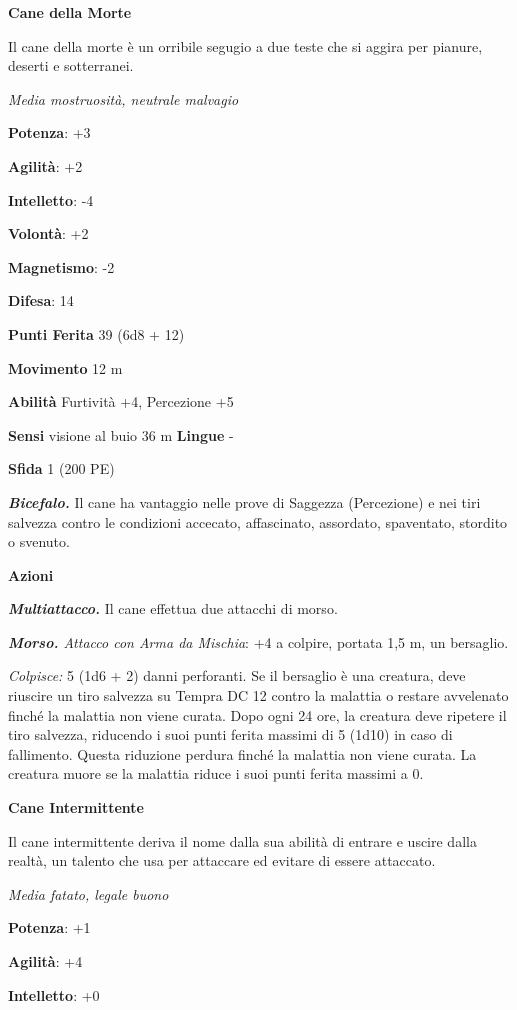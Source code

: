 \begin{multicols}{2}
\textbf{Cane della Morte}

Il cane della morte è un orribile segugio a due teste che si aggira per
pianure, deserti e sotterranei.

\emph{Media mostruosità, neutrale malvagio}

\textbf{Potenza}: +3

\textbf{Agilità}: +2

\textbf{Intelletto}: -4

\textbf{Volontà}: +2

\textbf{Magnetismo}: -2

\textbf{Difesa}: 14

\textbf{Punti Ferita} 39 (6d8 + 12)

\textbf{Movimento} 12 m

\textbf{Abilità} Furtività +4, Percezione +5

\textbf{Sensi} visione al buio 36 m
\textbf{Lingue} -

\textbf{Sfida} 1 (200 PE)

\emph{\textbf{Bicefalo.}} Il cane ha vantaggio nelle prove di Saggezza
(Percezione) e nei tiri salvezza contro le condizioni accecato,
affascinato, assordato, spaventato, stordito o svenuto.

\textbf{Azioni}

\emph{\textbf{Multiattacco.}} Il cane effettua due attacchi di morso.

\emph{\textbf{Morso.} Attacco con Arma da Mischia}: +4 a colpire,
portata 1,5 m, un bersaglio.

\emph{Colpisce:} 5 (1d6 + 2) danni perforanti. Se il bersaglio è una
creatura, deve riuscire un tiro salvezza su Tempra DC 12 contro la
malattia o restare avvelenato finché la malattia non viene curata. Dopo
ogni 24 ore, la creatura deve ripetere il tiro salvezza, riducendo i
suoi punti ferita massimi di 5 (1d10) in caso di fallimento. Questa
riduzione perdura finché la malattia non viene curata. La creatura muore
se la malattia riduce i suoi punti ferita massimi a 0.

\textbf{Cane Intermittente}

Il cane intermittente deriva il nome dalla sua abilità di entrare e
uscire dalla realtà, un talento che usa per attaccare ed evitare di
essere attaccato.

\emph{Media fatato, legale buono}

\textbf{Potenza}: +1

\textbf{Agilità}: +4

\textbf{Intelletto}: +0


\end{multicols}
